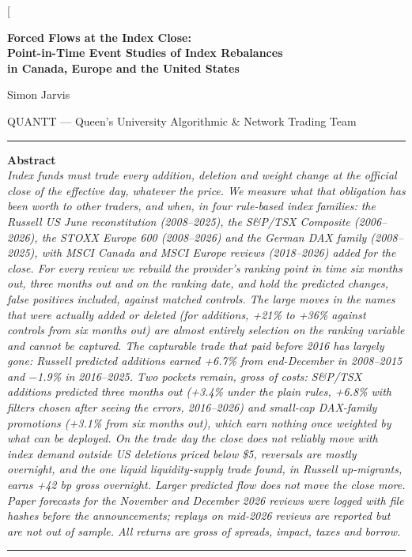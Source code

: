 \documentclass[10pt, a4paper, twocolumn]{article}
\begin{document}
\raggedbottom

\twocolumn[{%
\begin{center}
{\LARGE\bfseries Forced Flows at the Index Close:\\
Point-in-Time Event Studies of Index Rebalances\\ in Canada, Europe and the United States\par}
\vspace{0.8em}
{\large Simon Jarvis\par}
\vspace{0.4em}
{\normalsize
QUANTT --- Queen's University Algorithmic \& Network Trading Team\\
\vspace{0.3em}
}
\vspace{0.5em}

\begin{minipage}{0.92\textwidth}
\rule{\linewidth}{0.4pt}
\vspace{0.3em}
\textbf{Abstract}\\[0.3em]
\small\itshape
Index funds must trade every addition, deletion and weight change at the official close of the effective day, whatever the price. We measure what that obligation has been worth to other traders, and when, in four rule-based index families: the Russell US June reconstitution (2008--2025), the S\&P/TSX Composite (2006--2026), the STOXX Europe 600 (2008--2026) and the German DAX family (2008--2025), with MSCI Canada and MSCI Europe reviews (2018--2026) added for the close. For every review we rebuild the provider's ranking point in time six months out, three months out and on the ranking date, and hold the predicted changes, false positives included, against matched controls. The large moves in the names that were actually added or deleted (for additions, +21\% to +36\% against controls from six months out) are almost entirely selection on the ranking variable and cannot be captured. The capturable trade that paid before 2016 has largely gone: Russell predicted additions earned +6.7\% from end-December in 2008--2015 and $-$1.9\% in 2016--2025. Two pockets remain, gross of costs: S\&P/TSX additions predicted three months out (+3.4\% under the plain rules, +6.8\% with filters chosen after seeing the errors, 2016--2026) and small-cap DAX-family promotions (+3.1\% from six months out), which earn nothing once weighted by what can be deployed. On the trade day the close does not reliably move with index demand outside US deletions priced below \$5, reversals are mostly overnight, and the one liquid liquidity-supply trade found, in Russell up-migrants, earns +42 bp gross overnight. Larger predicted flow does not move the close more. Paper forecasts for the November and December 2026 reviews were logged with file hashes before the announcements; replays on mid-2026 reviews are reported but are not out of sample. All returns are gross of spreads, impact, taxes and borrow.
\vspace{0.3em}
\rule{\linewidth}{0.4pt}
\end{minipage}


\end{center}}
\end{document}
